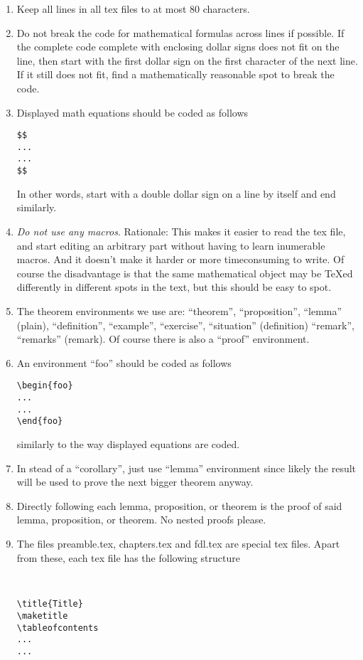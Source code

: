 \begin{enumerate}
\item Keep all lines in all tex files to at most 80 characters.
\item Do not break the code for mathematical formulas across
lines if possible. If the complete code complete with enclosing
dollar signs does not fit on the line, then start with the first
dollar sign on the first character of the next line. If it still
does not fit, find a mathematically reasonable spot to break
the code.
\item Displayed math equations should be coded as follows
\begin{verbatim}
$$
...
...
$$
\end{verbatim}
In other words, start with a double dollar sign on a line by itself
and end similarly.
\item {\it Do not use any macros}. Rationale: This makes it easier
to read the tex file, and start editing an arbitrary part
without having to learn inumerable macros.
And it doesn't make it harder or more timeconsuming to write.
Of course the disadvantage is that the same mathematical object
may be TeXed differently in different spots in the text, but
this should be easy to spot.
\item The theorem environments we use are:
``theorem'', ``proposition'', ``lemma'' (plain),
``definition'', ``example'', ``exercise'', ``situation'' (definition)
``remark'', ``remarks'' (remark). Of course there is also
a ``proof'' environment.
\item An environment ``foo'' should be coded as follows
\begin{verbatim}
\begin{foo}
...
...
\end{foo}
\end{verbatim}
similarly to the way displayed equations are coded.
\item In stead of a ``corollary'', just use ``lemma'' environment
since likely the result will be used to prove the next bigger
theorem anyway.
\item Directly following each lemma, proposition, or theorem
is the proof of said lemma, proposition, or theorem. No nested
proofs please.
\item The files preamble.tex, chapters.tex and fdl.tex are special
tex files. Apart from these, each tex file
has the following structure
\begin{verbatim}


\title{Title}
\maketitle
\tableofcontents
...
...





\end{verbatim}
\end{enumerate}
